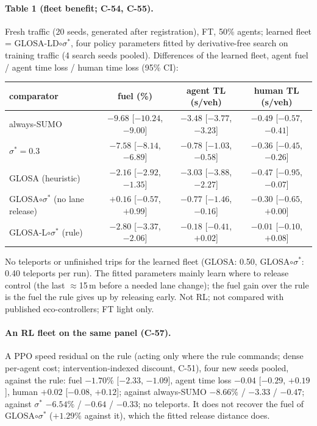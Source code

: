 \documentclass[11pt]{article}
\begin{document}
\paragraph{Table 1 (fleet benefit; C-54, C-55).} Fresh traffic (20 seeds, generated after registration), FT, 50\% agents; learned
fleet = GLOSA-LD$\circ\sigma^*$, four policy parameters fitted by derivative-free search on training traffic (4 search seeds pooled).
Differences of the learned fleet, agent fuel / agent time loss / human time loss (95\% CI):
\begin{center}\small\begin{tabular}{lccc}\toprule
comparator & fuel (\%) & agent TL (s/veh) & human TL (s/veh)\\\midrule
always-SUMO & $-9.68$ [$-10.24$, $-9.00$] & $-3.48$ [$-3.77$, $-3.23$] & $-0.49$ [$-0.57$, $-0.41$]\\
$\sigma^*=0.3$ & $-7.58$ [$-8.14$, $-6.89$] & $-0.78$ [$-1.03$, $-0.58$] & $-0.36$ [$-0.45$, $-0.26$]\\
GLOSA (heuristic) & $-2.16$ [$-2.92$, $-1.35$] & $-3.03$ [$-3.88$, $-2.27$] & $-0.47$ [$-0.95$, $-0.07$]\\
GLOSA$\circ\sigma^*$ (no lane release) & $+0.16$ [$-0.57$, $+0.99$] & $-0.77$ [$-1.46$, $-0.16$] & $-0.30$ [$-0.65$, $+0.00$]\\
GLOSA-L$\circ\sigma^*$ (rule) & $-2.80$ [$-3.37$, $-2.06$] & $-0.18$ [$-0.41$, $+0.02$] & $-0.01$ [$-0.10$, $+0.08$]\\\bottomrule
\end{tabular}\end{center}
No teleports or unfinished trips for the learned fleet (GLOSA: 0.50, GLOSA$\circ\sigma^*$: 0.40 teleports per run). The fitted
parameters mainly learn where to release control (the last $\approx$15\,m before a needed lane change); the fuel gain over the rule is the
fuel the rule gives up by releasing early. Not RL; not compared with published eco-controllers; FT light only.
\paragraph{An RL fleet on the same panel (C-57).} A PPO speed residual on the rule (acting only where the rule commands; dense per-agent
cost; intervention-indexed discount, C-51), four new seeds pooled, against the rule: fuel $-1.70\%$ [$-2.33$, $-1.09$], agent time loss
$-0.04$ [$-0.29$, $+0.19$], human $+0.02$ [$-0.08$, $+0.12$]; against always-SUMO $-8.66\%$ / $-3.33$ / $-0.47$; against $\sigma^*$
$-6.54\%$ / $-0.64$ / $-0.33$; no teleports. It does not recover the fuel of GLOSA$\circ\sigma^*$ ($+1.29\%$ against it), which the fitted
release distance does.
\end{document}
